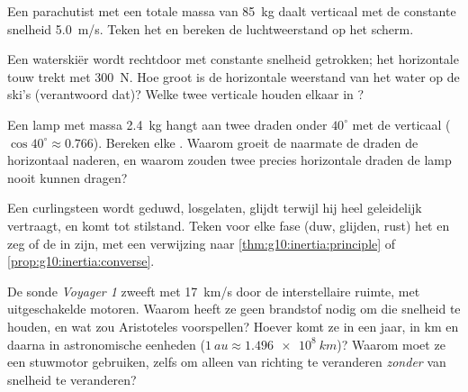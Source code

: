 \begin{exercise}[$\star\star$]\label{exo:g10:inertia:10}
Een parachutist met een totale massa van \qty{85}{kg} daalt verticaal
met de constante snelheid \qty{5.0}{m/s}. Teken het  en
bereken de luchtweerstand op het scherm.
\end{exercise}

\begin{exercise}[$\star\star$]\label{exo:g10:inertia:11}
Een waterskiër wordt rechtdoor met constante snelheid getrokken; het
horizontale touw trekt met \qty{300}{N}. Hoe groot is de horizontale
weerstand van het water op de ski's (verantwoord dat)? Welke twee
verticale  houden elkaar in ?
\end{exercise}

\begin{exercise}[$\star\star\star$]\label{exo:g10:inertia:12}
Een lamp met massa \qty{2.4}{kg} hangt aan twee draden onder $40^\circ$
met de verticaal ($\cos 40^\circ \approx 0.766$). Bereken elke
. Waarom groeit de  naarmate de draden de
horizontaal naderen, en waarom zouden twee precies horizontale draden de
lamp nooit kunnen dragen?
\end{exercise}

\begin{exercise}[$\star\star\star$]\label{exo:g10:inertia:13}
Een curlingsteen wordt geduwd, losgelaten, glijdt terwijl hij heel
geleidelijk vertraagt, en komt tot stilstand. Teken voor elke fase (duw,
glijden, rust) het  en zeg of de  in 
zijn, met een verwijzing naar \cref{thm:g10:inertia:principle} of
\cref{prop:g10:inertia:converse}.
\end{exercise}

\begin{exercise}[$\star\star\star$]\label{exo:g10:inertia:14}
De sonde \emph{Voyager 1} zweeft met \qty{17}{km/s} door de
interstellaire ruimte, met uitgeschakelde motoren. Waarom heeft ze geen
brandstof nodig om die snelheid te houden, en wat zou Aristoteles
voorspellen? Hoever komt ze in een jaar, in \unit{km} en daarna in
astronomische eenheden ($\qty{1}{au} \approx \qty{1.496e8}{km}$)? Waarom
moet ze een stuwmotor gebruiken, zelfs om alleen van richting te
veranderen \emph{zonder} van snelheid te veranderen?
\end{exercise}

